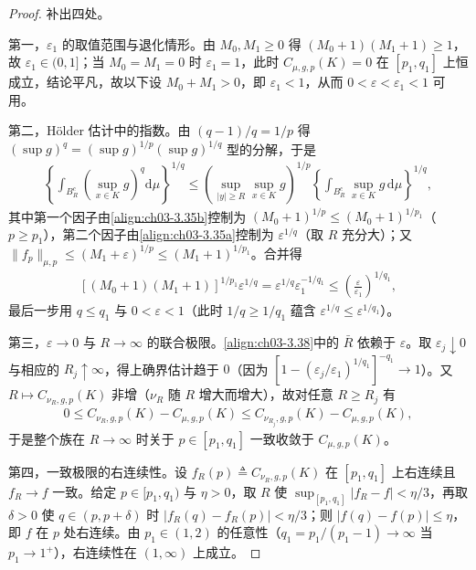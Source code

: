 \documentclass[../../main.tex]{subfiles}%
\begin{document}
\begin{proof}
补出四处。

第一，$\varepsilon_1$ 的取值范围与退化情形。由 $M_0,M_1\geqslant0$ 得 $(M_0+1)(M_1+1)\geqslant1$，故 $\varepsilon_1\in(0,1]$；当 $M_0=M_1=0$ 时 $\varepsilon_1=1$，此时 $C_{\mu,g,p}(K)=0$ 在 $[p_1,q_1]$ 上恒成立，结论平凡，故以下设 $M_0+M_1>0$，即 $\varepsilon_1<1$，从而 $0<\varepsilon<\varepsilon_1<1$ 可用。

第二，Hölder 估计中的指数。由 $(q-1)/q=1/p$ 得 $\left(\sup g\right)^{q}=\left(\sup g\right)^{1/p}\left(\sup g\right)^{1/q}$ 型的分解，于是
\begin{align*}
\left\{\int_{B_R^c}\left(\sup_{x\in K}g\right)^q\mathrm{d}\mu\right\}^{1/q}
\leqslant\left(\sup_{|y|\geqslant R}\sup_{x\in K}g\right)^{1/p}\left\{\int_{B_R^c}\sup_{x\in K}g\,\mathrm{d}\mu\right\}^{1/q},
\end{align*}
其中第一个因子由\eqref{align:ch03-3.35b}控制为 $(M_0+1)^{1/p}\leqslant(M_0+1)^{1/p_1}$（$p\geqslant p_1$），第二个因子由\eqref{align:ch03-3.35a}控制为 $\varepsilon^{1/q}$（取 $R$ 充分大）；又 $\|f_p\|_{\mu,p}\leqslant(M_1+\varepsilon)^{1/p}\leqslant(M_1+1)^{1/p_1}$。合并得
\begin{align*}
\left[(M_0+1)(M_1+1)\right]^{1/p_1}\varepsilon^{1/q}
=\varepsilon^{1/q}\varepsilon_1^{-1/q_1}\leqslant\left(\frac{\varepsilon}{\varepsilon_1}\right)^{1/q_1},
\end{align*}
最后一步用 $q\leqslant q_1$ 与 $0<\varepsilon<1$（此时 $1/q\geqslant1/q_1$ 蕴含 $\varepsilon^{1/q}\leqslant\varepsilon^{1/q_1}$）。

第三，$\varepsilon\to0$ 与 $R\to\infty$ 的联合极限。\eqref{align:ch03-3.38}中的 $\bar R$ 依赖于 $\varepsilon$。取 $\varepsilon_j\downarrow0$ 与相应的 $R_j\uparrow\infty$，得上确界估计趋于 $0$（因为 $[1-(\varepsilon_j/\varepsilon_1)^{1/q_1}]^{-q_1}\to1$）。又 $R\mapsto C_{\nu_R,g,p}(K)$ 非增（$\nu_R$ 随 $R$ 增大而增大），故对任意 $R\geqslant R_j$ 有
\begin{align*}
0\leqslant C_{\nu_R,g,p}(K)-C_{\mu,g,p}(K)\leqslant C_{\nu_{R_j},g,p}(K)-C_{\mu,g,p}(K),
\end{align*}
于是整个族在 $R\to\infty$ 时关于 $p\in[p_1,q_1]$ 一致收敛于 $C_{\mu,g,p}(K)$。

第四，一致极限的右连续性。设 $f_R(p)\triangleq C_{\nu_R,g,p}(K)$ 在 $[p_1,q_1]$ 上右连续且 $f_R\to f$ 一致。给定 $p\in[p_1,q_1)$ 与 $\eta>0$，取 $R$ 使 $\sup_{[p_1,q_1]}|f_R-f|<\eta/3$，再取 $\delta>0$ 使 $q\in(p,p+\delta)$ 时 $|f_R(q)-f_R(p)|<\eta/3$；则 $|f(q)-f(p)|\leqslant\eta$，即 $f$ 在 $p$ 处右连续。由 $p_1\in(1,2)$ 的任意性（$q_1=p_1/(p_1-1)\to\infty$ 当 $p_1\to1^+$），右连续性在 $(1,\infty)$ 上成立。
\end{proof}
\end{document}
